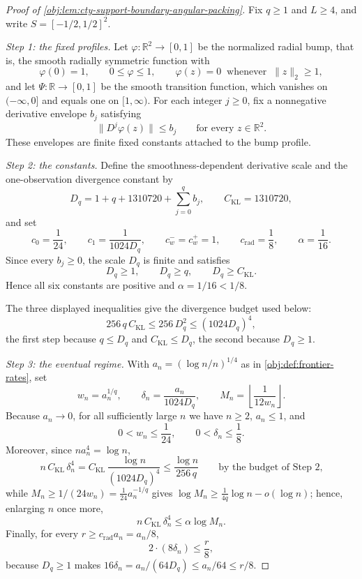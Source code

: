 \begin{proof}[Proof of \cref{obj:lem:cty-support-boundary-angular-packing}]
Fix \(q\ge1\) and \(L\ge4\), and write \(S=[-1/2,1/2]^2\).

\emph{Step 1: the fixed profiles.}  Let \(\varphi:\mathbb R^2\to[0,1]\) be the normalized radial bump, that is, the smooth radially symmetric function with
\[
\varphi(0)=1,
\qquad
0\le\varphi\le1,
\qquad
\varphi(z)=0\ \text{ whenever }\ \lVert z\rVert_2\ge1,
\]
and let \(\Psi:\mathbb R\to[0,1]\) be the smooth transition function, which vanishes on \((-\infty,0]\) and equals one on \([1,\infty)\).  For each integer \(j\ge0\), fix a nonnegative derivative envelope \(b_j\) satisfying
\[
\lVert D^j\varphi(z)\rVert\le b_j
\qquad\text{for every }z\in\mathbb R^2 .
\]
These envelopes are finite fixed constants attached to the bump profile.

\emph{Step 2: the constants.}  Define the smoothness-dependent derivative scale and the one-observation divergence constant by
\[
D_q=1+q+1310720+\sum_{j=0}^{q}b_j ,
\qquad
C_{\mathrm{KL}}=1310720 ,
\]
and set
\[
c_0=\frac1{24},\qquad
c_1=\frac1{1024D_q},\qquad
c_w^-=c_w^+=1,\qquad
c_{\mathrm{rad}}=\frac18,\qquad
\alpha=\frac1{16}.
\]
Since every \(b_j\ge0\), the scale \(D_q\) is finite and satisfies
\[
D_q\ge1,
\qquad
D_q\ge q,
\qquad
D_q\ge C_{\mathrm{KL}} .
\]
Hence all six constants are positive and \(\alpha=1/16<1/8\).

The three displayed inequalities give the divergence budget used below:
\[
256\,q\,C_{\mathrm{KL}}
\le
256\,D_q^{2}
\le
(1024D_q)^{4},
\]
the first step because \(q\le D_q\) and \(C_{\mathrm{KL}}\le D_q\), the second because \(D_q\ge1\).

\emph{Step 3: the eventual regime.}  With \(a_n=(\log n/n)^{1/4}\) as in \cref{obj:def:frontier-rates}, set
\[
w_n=a_n^{1/q},
\qquad
\delta_n=\frac{a_n}{1024D_q},
\qquad
M_n=\left\lfloor\frac1{12w_n}\right\rfloor .
\]
Because \(a_n\to0\), for all sufficiently large \(n\) we have \(n\ge2\), \(a_n\le1\), and
\[
0<w_n\le\frac1{24},
\qquad
0<\delta_n\le\frac18 .
\]
Moreover, since \(n a_n^{4}=\log n\),
\[
n\,C_{\mathrm{KL}}\,\delta_n^{4}
=
C_{\mathrm{KL}}\,\frac{\log n}{(1024D_q)^{4}}
\le
\frac{\log n}{256\,q}
\qquad\text{by the budget of Step 2,}
\]
while \(M_n\ge 1/(24w_n)=\tfrac1{24}a_n^{-1/q}\) gives \(\log M_n\ge \tfrac1{4q}\log n-o(\log n)\); hence, enlarging \(n\) once more,
\[
n\,C_{\mathrm{KL}}\,\delta_n^{4}\le\alpha\log M_n .
\]
Finally, for every \(r\ge c_{\mathrm{rad}}a_n=a_n/8\),
\[
2\cdot(8\delta_n)\le\frac{r}{8},
\]
because \(D_q\ge1\) makes \(16\delta_n=a_n/(64D_q)\le a_n/64\le r/8\).


\end{proof}
